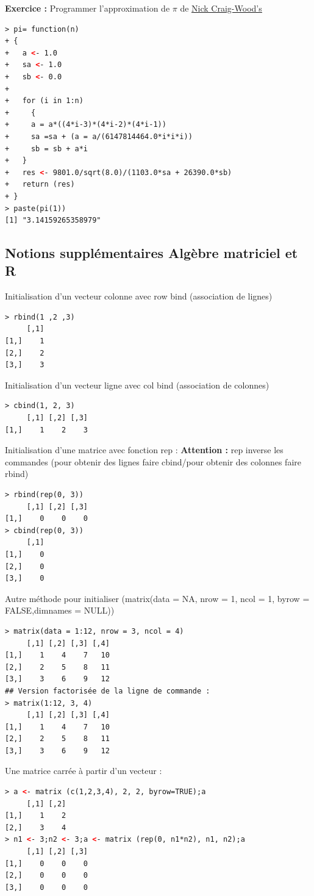 \textbf{Exercice :} \newline
Programmer l'approximation de $\pi$ de \href{https://www.craig-wood.com/nick/}{\underline{Nick Craig-Wood's}} 
\begin{lstlisting}[language=html]
> pi= function(n)
+ {
+   a <- 1.0
+   sa <- 1.0
+   sb <- 0.0
+   
+   for (i in 1:n)
+     {
+     a = a*((4*i-3)*(4*i-2)*(4*i-1))
+     sa =sa + (a = a/(6147814464.0*i*i*i))
+     sb = sb + a*i
+   }
+   res <- 9801.0/sqrt(8.0)/(1103.0*sa + 26390.0*sb)
+   return (res)
+ }
> paste(pi(1))
[1] "3.14159265358979"
\end{lstlisting}

\subsection{Notions supplémentaires Algèbre matriciel et R}
Initialisation d'un vecteur colonne avec row bind (association de lignes) 
\begin{lstlisting}[language=html]
> rbind(1 ,2 ,3)
     [,1]
[1,]    1
[2,]    2
[3,]    3
\end{lstlisting}
Initialisation d'un vecteur ligne avec col bind (association de colonnes) 
\begin{lstlisting}[language=html]
> cbind(1, 2, 3)
     [,1] [,2] [,3]
[1,]    1    2    3
\end{lstlisting}
Initialisation d'une matrice avec fonction rep : \newline
\textbf{Attention : } rep inverse les commandes (pour obtenir des lignes faire cbind/pour obtenir des colonnes faire rbind)
\begin{lstlisting}[language=html]
> rbind(rep(0, 3))
     [,1] [,2] [,3]
[1,]    0    0    0
> cbind(rep(0, 3))
     [,1]
[1,]    0
[2,]    0
[3,]    0
\end{lstlisting}
Autre méthode pour initialiser (matrix(data = NA, nrow = 1, ncol = 1, byrow = FALSE,dimnames = NULL))
\begin{lstlisting}[language=html]
> matrix(data = 1:12, nrow = 3, ncol = 4)
     [,1] [,2] [,3] [,4]
[1,]    1    4    7   10
[2,]    2    5    8   11
[3,]    3    6    9   12
## Version factorisée de la ligne de commande : 
> matrix(1:12, 3, 4)
     [,1] [,2] [,3] [,4]
[1,]    1    4    7   10
[2,]    2    5    8   11
[3,]    3    6    9   12
\end{lstlisting}
Une matrice carrée à partir d'un vecteur : 
\begin{lstlisting}[language=html]
> a <- matrix (c(1,2,3,4), 2, 2, byrow=TRUE);a
     [,1] [,2]
[1,]    1    2
[2,]    3    4
> n1 <- 3;n2 <- 3;a <- matrix (rep(0, n1*n2), n1, n2);a
     [,1] [,2] [,3]
[1,]    0    0    0
[2,]    0    0    0
[3,]    0    0    0
\end{lstlisting}

